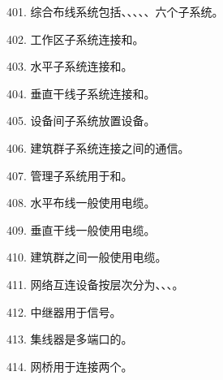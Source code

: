 401. 综合布线系统包括\underline{\hspace{1.5cm}}、\underline{\hspace{1.5cm}}、\underline{\hspace{1.5cm}}、\underline{\hspace{1.5cm}}、\underline{\hspace{1.5cm}}、\underline{\hspace{1.5cm}}六个子系统。

402. 工作区子系统连接\underline{\hspace{2cm}}和\underline{\hspace{2cm}}。

403. 水平子系统连接\underline{\hspace{2cm}}和\underline{\hspace{2cm}}。

404. 垂直干线子系统连接\underline{\hspace{2cm}}和\underline{\hspace{2cm}}。

405. 设备间子系统放置\underline{\hspace{2cm}}设备。

406. 建筑群子系统连接\underline{\hspace{2cm}}之间的通信。

407. 管理子系统用于\underline{\hspace{2cm}}和\underline{\hspace{2cm}}。

408. 水平布线一般使用\underline{\hspace{2cm}}电缆。

409. 垂直干线一般使用\underline{\hspace{2cm}}电缆。

410. 建筑群之间一般使用\underline{\hspace{2cm}}电缆。

411. 网络互连设备按层次分为\underline{\hspace{2cm}}、\underline{\hspace{2cm}}、\underline{\hspace{2cm}}、\underline{\hspace{2cm}}。

412. 中继器用于\underline{\hspace{2cm}}信号。

413. 集线器是多端口的\underline{\hspace{2cm}}。

414. 网桥用于连接两个\underline{\hspace{2cm}}。

